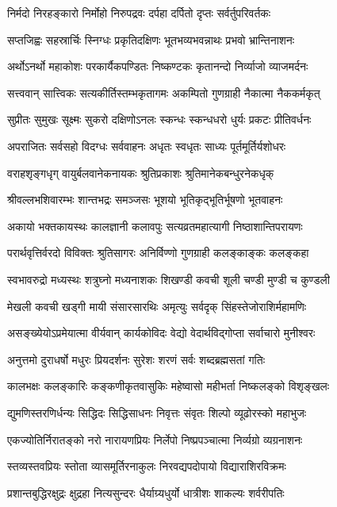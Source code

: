 \twolineshloka
{निर्मदो निरहङ्कारो निर्मोहो निरुपद्रवः}
{दर्पहा दर्पितो दृप्तः सर्वर्तुपरिवर्तकः}

\twolineshloka
{सप्तजिह्वः सहस्रार्चिः स्निग्धः प्रकृतिदक्षिणः}
{भूतभव्यभवन्नाथः प्रभवो भ्रान्तिनाशनः}

\twolineshloka
{अर्थोऽनर्थो महाकोशः परकार्यैकपण्डितः}
{निष्कण्टकः कृतानन्दो निर्व्याजो व्याजमर्दनः}

\twolineshloka
{सत्त्ववान् सात्त्विकः सत्यकीर्तिस्तम्भकृतागमः}
{अकम्पितो गुणग्राही नैकात्मा नैककर्मकृत्}

\twolineshloka
{सुप्रीतः सुमुखः सूक्ष्मः सुकरो दक्षिणोऽनलः}
{स्कन्धः स्कन्धधरो धुर्यः प्रकटः प्रीतिवर्धनः}

\twolineshloka
{अपराजितः सर्वसहो विदग्धः सर्ववाहनः}
{अधृतः स्वधृतः साध्यः पूर्तमूर्तिर्यशोधरः}

\twolineshloka
{वराहशृङ्गधृग् वायुर्बलवानेकनायकः}
{श्रुतिप्रकाशः श्रुतिमानेकबन्धुरनेकधृक्}

\twolineshloka
{श्रीवल्लभशिवारम्भः शान्तभद्रः समञ्जसः}
{भूशयो भूतिकृद्भूतिर्भूषणो भूतवाहनः}

\twolineshloka
{अकायो भक्तकायस्थः कालज्ञानी कलावपुः}
{सत्यव्रतमहात्यागी निष्ठाशान्तिपरायणः}

\twolineshloka
{परार्थवृत्तिर्वरदो विविक्तः श्रुतिसागरः}
{अनिर्विण्णो गुणग्राही कलङ्काङ्कः कलङ्कहा}

\twolineshloka
{स्वभावरुद्रो मध्यस्थः शत्रुघ्नो मध्यनाशकः}
{शिखण्डी कवची शूली चण्डी मुण्डी च कुण्डली}

\twolineshloka
{मेखली कवची खड्गी मायी संसारसारथिः}
{अमृत्युः सर्वदृक् सिंहस्तेजोराशिर्महामणिः}

\twolineshloka
{असङ्ख्येयोऽप्रमेयात्मा वीर्यवान् कार्यकोविदः}
{वेद्यो वेदार्थविद्गोप्ता सर्वाचारो मुनीश्वरः}

\twolineshloka
{अनुत्तमो दुराधर्षो मधुरः प्रियदर्शनः}
{सुरेशः शरणं सर्वः शब्दब्रह्मसतां गतिः}

\twolineshloka
{कालभक्षः कलङ्कारिः कङ्कणीकृतवासुकिः}
{महेष्वासो महीभर्ता निष्कलङ्को विशृङ्खलः}

\twolineshloka
{द्युमणिस्तरणिर्धन्यः सिद्धिदः सिद्धिसाधनः}
{निवृत्तः संवृतः शिल्पो व्यूढोरस्को महाभुजः}

\twolineshloka
{एकज्योतिर्निरातङ्को नरो नारायणप्रियः}
{निर्लेपो निष्प्रपञ्चात्मा निर्व्यग्रो व्यग्रनाशनः}

\twolineshloka
{स्तव्यस्तवप्रियः स्तोता व्यासमूर्तिरनाकुलः}
{निरवद्यपदोपायो विद्याराशिरविक्रमः}

\twolineshloka
{प्रशान्तबुद्धिरक्षुद्रः क्षुद्रहा नित्यसुन्दरः}
{धैर्याग्र्यधुर्यो धात्रीशः शाकल्यः शर्वरीपतिः}

